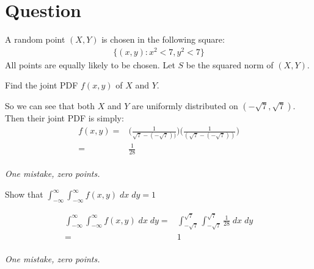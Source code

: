\section{Question}

A random point $(X,Y)$ is chosen in the following square:
\begin{align*}
    \{(x, y) : x^2 < 7,  y^2 < 7 \}
\end{align*}
All points are equally likely to be chosen. Let $S$ be the squared norm of $(X,Y)$.
\begin{exercise}[0.5]
Find the joint PDF $f(x,y)$ of $X$ and $Y$.
\begin{solution}
So we can see that both $X$ and $Y$ are uniformly distributed on $(-\sqrt{7}, \sqrt{7})$. Then their joint PDF is simply:
\begin{align*}
    f(x,y) =& \Big(\frac{1}{\sqrt{7} - (-\sqrt{7}))} \Big) \Big(\frac{1}{(\sqrt{7} - (-\sqrt{7}))} \Big) \\
    =& \frac{1}{28}
\end{align*}\\
\textit{One mistake, zero points.}
\end{solution}
\end{exercise}

\begin{exercise}[0.5]
Show that $\int_{-\infty}^\infty \int_{-\infty}^\infty f(x,y) \; dx \; dy = 1$
\begin{solution}
 \begin{align*}
      \int_{-\infty}^\infty \int_{-\infty}^\infty f(x,y) \; dx \; dy =& \int_{-\sqrt{7}}^{\sqrt{7}} \int_{-\sqrt{7}}^{\sqrt{7}} \frac{1}{28} \; dx \; dy \\
      =& 1
    \end{align*} \\
    \textit{One mistake, zero points.}
\end{solution}

\end{exercise}

